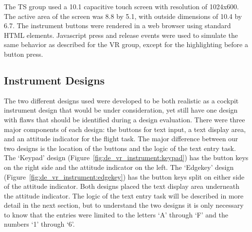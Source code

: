 The TS group used a \SI{10.1}{\inch} capacitive touch screen with resolution of 1024x600.
The active area of the screen was \SI{8.8}{\inch} by \SI{5.1}{\inch}, with outside dimensions of \SI{10.4}{\inch} by \SI{6.7}{\inch}.
The instrument buttons were rendered in a web browser using standard HTML elements.
Javascript press and release events were used to simulate the same behavior as described for the VR group, except for the highlighting before a button press.

\subsection{Instrument Designs}

The two different designs used were developed to be both realistic as a cockpit instrument design that would be under consideration, yet still have one design with flaws that should be identified during a design evaluation.
There were three major components of each design: the buttons for text input, a text display area, and an attitude indicator for the flight task.
The major difference between our two designs is the location of the buttons and the logic of the text entry task.
The `Keypad' design (Figure~\ref{fig:de_vr_instrument:keypad}) has the button keys on the right side and the attitude indicator on the left.
The `Edgekey' design (Figure~\ref{fig:de_vr_instrument:edgekey}) has the button keys split on either side of the attitude indicator.
Both designs placed the text display area underneath the attitude indicator.
The logic of the text entry task will be described in more detail in the next section, but to understand the two designs it is only necessary to know that the entries were limited to the letters `A' through `F' and the numbers `1' through `6'.


